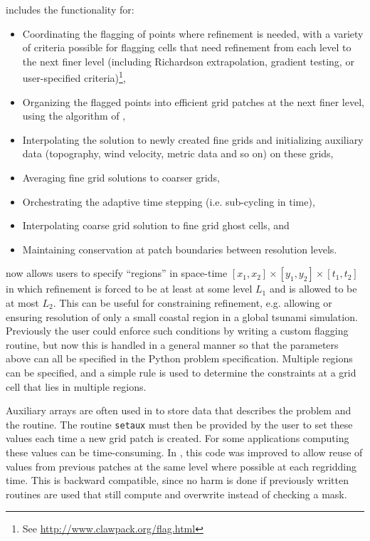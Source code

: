 \amrclaw includes the functionality for:
\begin{itemize}
\item Coordinating the flagging of points where refinement is needed,
with a variety of criteria possible for flagging cells that need refinement
from each level to the next finer level (including Richardson extrapolation,
gradient testing, or user-specified criteria)\footnote{See
\url{http://www.clawpack.org/flag.html}},
\item Organizing the flagged points into efficient grid
patches at the next finer level, using the algorithm of
\cite{mjb-rig:cluster},
\item Interpolating the solution to newly created fine grids and initializing
auxiliary data (topography, wind velocity, metric data and so on) on  these
grids,
\item Averaging fine grid solutions to coarser grids,
\item Orchestrating the adaptive time stepping (i.e. sub-cycling in time),
\item Interpolating coarse grid solution to fine grid ghost cells, and
\item Maintaining conservation at patch boundaries between resolution levels.
\end{itemize}

\amrclaw now allows users to specify ``regions'' in space-time
$[x_1,x_2] \times [y_1,y_2] \times [t_1,t_2]$ in which refinement is forced to
be at least at some level $L_1$ and is allowed to be at most $L_2$.  This can be
useful for constraining refinement, e.g. allowing or ensuring resolution of only
a small coastal region in a global tsunami simulation. Previously the user could
enforce such conditions by writing a custom flagging routine, but now this is
handled in a general manner so that the parameters above can all be specified in
the Python problem specification. Multiple regions can be specified, and a
simple rule is used to determine the constraints at a grid cell that lies in
multiple regions.

Auxiliary arrays are often used in \clawpack to store data that
describes the problem and the routine.
The routine \texttt{setaux} must then be provided by the user to set these values each time a
new grid patch is created.  For some applications computing these values can be time-consuming.  In ,
this code was improved to allow reuse of values from previous patches at
the same level where possible at each regridding time.
This is backward compatible, since no harm is done if previously
written routines are used that still compute and overwrite instead of
checking a mask.

